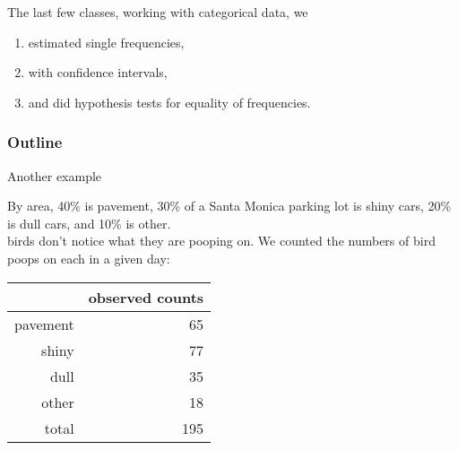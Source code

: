 %
%
%



\subtitle{$\chi^2$ between two samples}

\date{7 April 2015}






\begin{frame}
  \maketitle
\end{frame}


\begin{frame}{The last few classes,}
    working with \alert{categorical data}, we
  \begin{enumerate}
      \item estimated single frequencies,
      \item with confidence intervals,
      \item and did hypothesis tests for equality of frequencies.
  \end{enumerate}
\end{frame}

\begin{frame}\frametitle<presentation>{Outline}
  \tableofcontents
\end{frame}

\begin{frame}{Another example}

    By area, 
    40\% is pavement,
    30\% of a Santa Monica parking lot is shiny cars,
    20\% is dull cars,
    and 10\% is other.\\
     birds don't notice what they are pooping on.
    We counted the numbers of bird poops on each in a given day:
    \begin{center}
        \begin{tabular}{rr}
            & observed counts \\
            \hline 
            pavement & 65 \\
            shiny & 77 \\
            dull & 35 \\
            other & 18 \\
            \hline
            total & 195
        \end{tabular}
    \end{center}

\end{frame}



